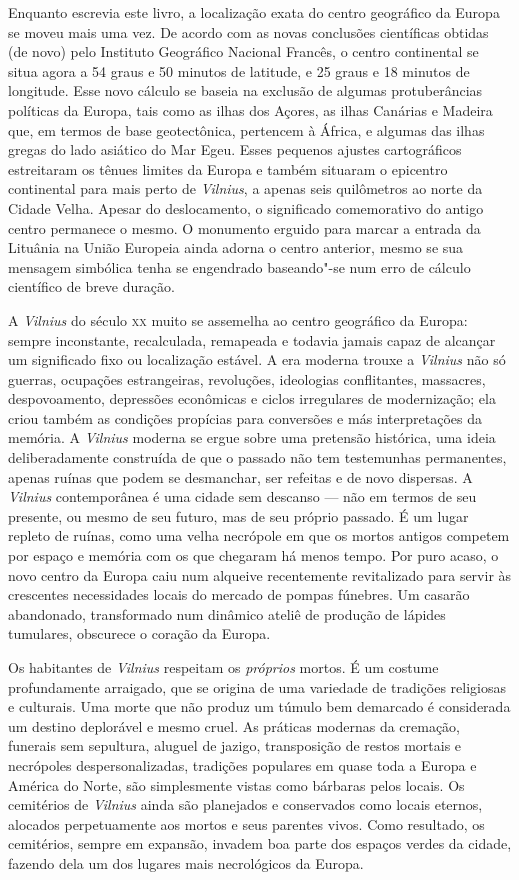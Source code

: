 Enquanto escrevia este livro, a localização exata do centro geográfico
da Europa se moveu mais uma vez. De acordo com as novas conclusões
científicas obtidas (de novo) pelo Instituto Geográfico Nacional
Francês, o centro continental se situa agora a 54 graus e 50 minutos de
latitude, e 25 graus e 18 minutos de longitude. Esse novo cálculo se
baseia na exclusão de algumas protuberâncias políticas da Europa, tais
como as ilhas dos Açores, as ilhas Canárias e Madeira que, em termos de
base geotectônica, pertencem à África, e algumas das ilhas gregas do
lado asiático do Mar Egeu. Esses pequenos ajustes cartográficos
estreitaram os tênues limites da Europa e também situaram o epicentro
continental para mais perto de \textit{Vilnius}, a apenas seis quilômetros ao
norte da Cidade Velha. Apesar do deslocamento, o significado
comemorativo do antigo centro permanece o mesmo. O monumento erguido
para marcar a entrada da Lituânia na União Europeia ainda adorna o
centro anterior, mesmo se sua mensagem simbólica tenha se engendrado
baseando"-se num erro de cálculo científico de breve duração.

A \textit{Vilnius} do século \textsc{xx} muito se assemelha ao centro geográfico da
Europa: sempre inconstante, recalculada, remapeada e todavia jamais
capaz de alcançar um significado fixo ou localização estável. A era
moderna trouxe a \textit{Vilnius} não só guerras, ocupações estrangeiras,
revoluções, ideologias conflitantes, massacres, despovoamento,
depressões econômicas e ciclos irregulares de modernização; ela criou
também as condições propícias para conversões e más interpretações da
memória. A \textit{Vilnius} moderna se ergue sobre uma pretensão histórica, uma
ideia deliberadamente construída de que o passado não tem testemunhas
permanentes, apenas ruínas que podem se desmanchar, ser refeitas e de
novo dispersas. A \textit{Vilnius} contemporânea é uma cidade sem descanso --- não
em termos de seu presente, ou mesmo de seu futuro, mas de seu próprio
passado. É um lugar repleto de ruínas, como uma velha necrópole em que
os mortos antigos competem por espaço e memória com os que chegaram há
menos tempo. Por puro acaso, o novo centro da Europa caiu num alqueive
recentemente revitalizado para servir às crescentes necessidades locais
do mercado de pompas fúnebres. Um casarão abandonado, transformado num
dinâmico ateliê de produção de lápides tumulares, obscurece o coração da
Europa.

Os habitantes de \textit{Vilnius} respeitam os \textit{próprios} mortos. É um
costume profundamente arraigado, que se origina de uma variedade de
tradições religiosas e culturais. Uma morte que não produz um túmulo bem
demarcado é considerada um destino deplorável e mesmo cruel. As práticas
modernas da cremação, funerais sem sepultura, aluguel de jazigo,
transposição de restos mortais e necrópoles despersonalizadas, tradições
populares em quase toda a Europa e América do Norte, são simplesmente
vistas como bárbaras pelos locais. Os cemitérios de \textit{Vilnius} ainda são
planejados e conservados como locais eternos, alocados perpetuamente aos
mortos e seus parentes vivos. Como resultado, os cemitérios, sempre em
expansão, invadem boa parte dos espaços verdes da cidade, fazendo dela
um dos lugares mais necrológicos da Europa.

